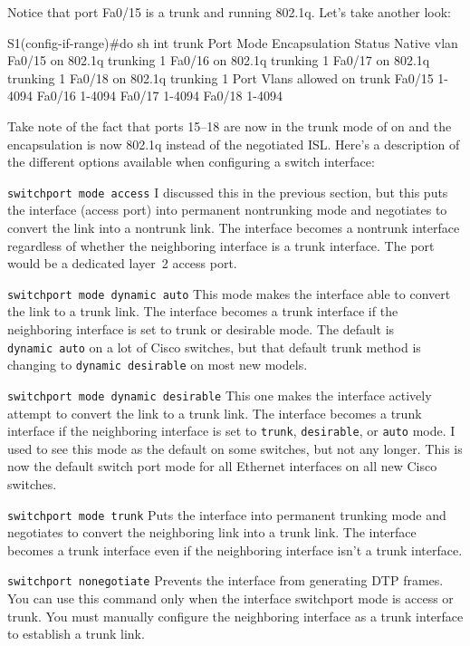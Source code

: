 Notice that port Fa0/15 is a trunk and running 802.1q.
Let's take another look:

\begin{cli}
S1(config-if-range)#do sh int trunk
Port        Mode             Encapsulation  Status        Native vlan
Fa0/15      on               802.1q         trunking      1
Fa0/16      on               802.1q         trunking      1
Fa0/17      on               802.1q         trunking      1
Fa0/18      on               802.1q         trunking      1
Port        Vlans allowed on trunk
Fa0/15      1-4094
Fa0/16      1-4094
Fa0/17      1-4094
Fa0/18      1-4094
\end{cli}

Take note of the fact that ports 15--18 are now in the trunk mode of on
and the encapsulation is now 802.1q instead of the negotiated ISL.
Here's a description of the different options available when configuring
a switch interface:

\texttt{switchport\ mode\ access} I discussed this in the previous
section, but this puts the interface (access port) into permanent
nontrunking mode and negotiates to convert the link into a nontrunk
link. The interface becomes a nontrunk interface regardless of whether
the neighboring interface is a trunk interface. The port would be a
dedicated layer~2 access port.

\texttt{switchport\ mode\ dynamic\ auto} This mode makes the interface
able to convert the link to a trunk link. The interface becomes a trunk
interface if the neighboring interface is set to trunk or desirable
mode. The default is \texttt{dynamic\ auto} on a lot of Cisco switches,
but that default trunk method is changing to \texttt{dynamic\ desirable}
on most new models.

\texttt{switchport\ mode\ dynamic\ desirable} This one makes the
interface actively attempt to convert the link to a trunk link. The
interface becomes a trunk interface if the neighboring interface is set
to \texttt{trunk}, \texttt{desirable}, or \texttt{auto} mode. I used to
see this mode as the default on some switches, but not any longer. This
is now the default switch port mode for all Ethernet interfaces on all
new Cisco switches.

\texttt{switchport\ mode\ trunk} Puts the interface into permanent
trunking mode and negotiates to convert the neighboring link into a
trunk link. The interface becomes a trunk interface even if the
neighboring interface isn't a trunk interface.

\texttt{switchport\ nonegotiate} Prevents the interface from generating
DTP frames. You can use this command only when the interface switchport
mode is access or trunk. You must manually configure the neighboring
interface as a trunk interface to establish a trunk link.

